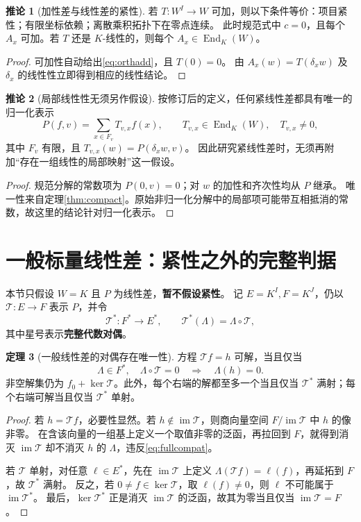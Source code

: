\documentclass[UTF8,11pt,a4paper]{ctexart}
\theoremstyle{definition}
\newtheorem{theorem}{定理}[section]
\newtheorem{corollary}[theorem]{推论}
\newcommand{\End}{\operatorname{End}}
\newcommand{\im}{\operatorname{im}}
\newcommand{\T}{\mathcal T}
\begin{document}
\begin{corollary}[加性差与线性差的紧性]\label{cor:lincompact}
若 $T:W^I\to W$ 可加，则以下条件等价：项目紧性；有限坐标依赖；离散乘积拓扑下在零点连续。
此时规范式中 $c=0$，且每个 $A_x$ 可加。若 $T$ 还是 $K$-线性的，则每个 $A_x\in\End_K(W)$。
\end{corollary}
\begin{proof}
可加性自动给出\eqref{eq:orthadd}，且 $T(0)=0$。
由 $A_x(w)=T(\delta_xw)$ 及 $\delta_x$ 的线性性立即得到相应的线性结论。
\end{proof}

\begin{corollary}[局部线性性无须另作假设]\label{cor:autolocal}
按修订后的定义，任何紧线性差都具有唯一的归一化表示
\[
 P(f,v)=\sum_{x\in F_v}T_{v,x}f(x),\qquad
 T_{v,x}\in\End_K(W),\quad T_{v,x}\ne0,
\]
其中 $F_v$ 有限，且 $T_{v,x}(w)=P(\delta_xw,v)$。
因此研究紧线性差时，无须再附加“存在一组线性的局部映射”这一假设。
\end{corollary}
\begin{proof}
规范分解的常数项为 $P(0,v)=0$；对 $w$ 的加性和齐次性均从 $P$ 继承。
唯一性来自定理\ref{thm:compact}。原始非归一化分解中的局部项可能带互相抵消的常数，故这里的结论针对归一化表示。
\end{proof}

\section{一般标量线性差：紧性之外的完整判据}\label{sec:noncompact}
本节只假设 $W=K$ 且 $P$ 为线性差，\textbf{暂不假设紧性}。
记 $E=K^I,F=K^J$，仍以 $\T:E\to F$ 表示 $P$，并令
\[
 \T^*:F^*\to E^*,\qquad \T^*(\Lambda)=\Lambda\circ\T,
\]
其中星号表示\textbf{完整代数对偶}。

\begin{theorem}[一般线性差的对偶存在唯一性]\label{thm:fullalgebraic}
方程 $\T f=h$ 可解，当且仅当
\begin{equation}\label{eq:fullcompat}
 \Lambda\in F^*,\quad \Lambda\circ\T=0
 \quad\Longrightarrow\quad \Lambda(h)=0.
\end{equation}
非空解集仍为 $f_0+\ker\T$。此外，每个右端的解都至多一个当且仅当 $\T^*$ 满射；每个右端可解当且仅当 $\T^*$ 单射。
\end{theorem}
\begin{proof}
若 $h=\T f$，必要性显然。若 $h\notin\im\T$，则商向量空间 $F/\im\T$ 中 $h$ 的像非零。
在含该向量的一组基上定义一个取值非零的泛函，再拉回到 $F$，就得到消灭 $\im\T$ 却不消灭 $h$ 的 $\Lambda$，违反\eqref{eq:fullcompat}。

若 $\T$ 单射，对任意 $\ell\in E^*$，先在 $\im\T$ 上定义 $\Lambda(\T f)=\ell(f)$，再延拓到 $F$，故 $\T^*$ 满射。
反之，若 $0\ne f\in\ker\T$，取 $\ell(f)\ne0$，则 $\ell$ 不可能属于 $\im\T^*$。
最后，$\ker\T^*$ 正是消灭 $\im\T$ 的泛函，故其为零当且仅当 $\im\T=F$。
\end{proof}
\end{document}

